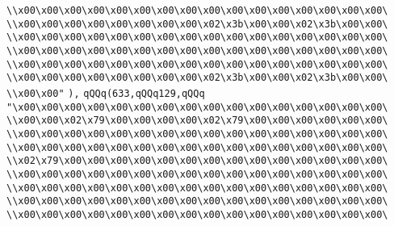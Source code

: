 \verb|\\x00\x00\x00\x00\x00\x00\x00\x00\x00\x00\x00\x00\x00\x00\x00\x00\|\newline
\verb|\\x00\x00\x00\x00\x00\x00\x00\x00\x02\x3b\x00\x00\x02\x3b\x00\x00\|\newline
\verb|\\x00\x00\x00\x00\x00\x00\x00\x00\x00\x00\x00\x00\x00\x00\x00\x00\|\newline
\verb|\\x00\x00\x00\x00\x00\x00\x00\x00\x00\x00\x00\x00\x00\x00\x00\x00\|\newline
\verb|\\x00\x00\x00\x00\x00\x00\x00\x00\x00\x00\x00\x00\x00\x00\x00\x00\|\newline
\verb|\\x00\x00\x00\x00\x00\x00\x00\x00\x02\x3b\x00\x00\x02\x3b\x00\x00\|\newline
\verb|\\x00\x00"|\newline
\verb|),|\newline
\verb|qQQq(633,qQQq129,qQQq|\newline
\verb|"\x00\x00\x00\x00\x00\x00\x00\x00\x00\x00\x00\x00\x00\x00\x00\x00\|\newline
\verb|\\x00\x00\x02\x79\x00\x00\x00\x00\x02\x79\x00\x00\x00\x00\x00\x00\|\newline
\verb|\\x00\x00\x00\x00\x00\x00\x00\x00\x00\x00\x00\x00\x00\x00\x00\x00\|\newline
\verb|\\x00\x00\x00\x00\x00\x00\x00\x00\x00\x00\x00\x00\x00\x00\x00\x00\|\newline
\verb|\\x02\x79\x00\x00\x00\x00\x00\x00\x00\x00\x00\x00\x00\x00\x00\x00\|\newline
\verb|\\x00\x00\x00\x00\x00\x00\x00\x00\x00\x00\x00\x00\x00\x00\x00\x00\|\newline
\verb|\\x00\x00\x00\x00\x00\x00\x00\x00\x00\x00\x00\x00\x00\x00\x00\x00\|\newline
\verb|\\x00\x00\x00\x00\x00\x00\x00\x00\x00\x00\x00\x00\x00\x00\x00\x00\|\newline
\verb|\\x00\x00\x00\x00\x00\x00\x00\x00\x00\x00\x00\x00\x00\x00\x00\x00\|\newline
